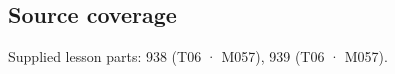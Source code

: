 \subsection{Source coverage}\label{appendix-daaf25bfd3a0-source-coverage}

Supplied lesson parts: 938 (T06 · M057), 939 (T06 · M057).
